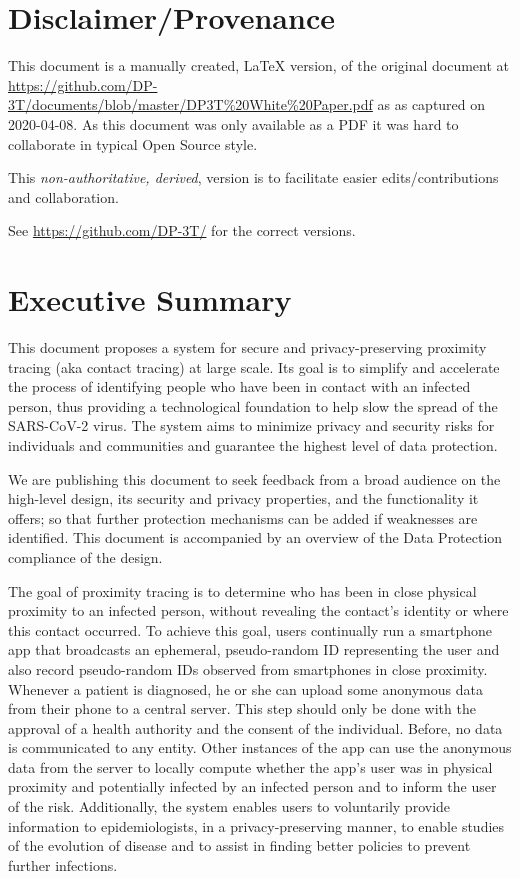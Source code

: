 \documentclass[12pt,a4paper]{article}
\begin{document}
\pagebreak

\section*{Disclaimer/Provenance}

This document is a manually created, LaTeX version, of the original document at \url{https://github.com/DP-3T/documents/blob/master/DP3T\%20White\%20Paper.pdf} as 
as captured on 2020-04-08. As this document was only available as a PDF it was hard to collaborate in typical Open Source style.

This\emph{ non-authoritative, derived}, version is to facilitate easier edits/contributions and collaboration.

See \url{https://github.com/DP-3T/} for the correct versions.

\pagebreak

\section*{Executive Summary}
This document proposes a system for secure and privacy-preserving proximity tracing (aka
contact tracing) at large scale. Its goal is to simplify and accelerate the process of identifying people who have been in contact with an infected person, thus providing a technological foundation to help slow the spread of the SARS-CoV-2 virus. The system aims to minimize privacy and security risks for individuals and communities and guarantee the highest level of data protection.

We are publishing this document to seek feedback from a broad audience on the high-level
design, its security and privacy properties, and the functionality it offers; so that further protection mechanisms can be added if weaknesses are identified. This document is
accompanied by an overview of the Data Protection compliance of the design.

The goal of proximity tracing is to determine who has been in close physical proximity to an infected person, without revealing the contact’s identity or where this contact occurred. To achieve this goal, users continually run a smartphone app that broadcasts an ephemeral, pseudo-random ID representing the user and also record pseudo-random IDs observed from smartphones in close proximity. Whenever a patient is diagnosed, he or she can upload some anonymous data from their phone to a central server. This step should only be done  with the approval of a health authority and the consent of the individual. Before, no data is communicated to any entity. Other instances of the app can use the anonymous data from the server to locally compute whether the app’s user was in physical proximity and potentially infected by an infected person and to inform the user of the risk. Additionally, the system enables users to voluntarily provide information to epidemiologists, in a privacy-preserving manner, to enable studies of the evolution of disease and to assist in finding better policies to prevent further infections.
\end{document}
